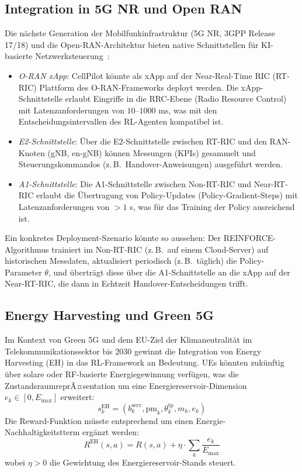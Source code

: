 ﻿\documentclass[a4paper,12pt]{article}
\theoremstyle{definition}
\begin{document}
\subsection{Integration in 5G NR und Open RAN}

Die n\"achste Generation der Mobilfunkinfrastruktur (5G NR, 3GPP Release 17/18)
und die Open-RAN-Architektur bieten native Schnittstellen f\"ur KI-basierte
Netzwerksteuerung~\cite{polese2022}:

\begin{itemize}
  \item \emph{O-RAN xApp}: CellPilot k\"onnte als xApp auf der Near-Real-Time RIC (RT-RIC)
    Plattform des O-RAN-Frameworks deployt werden. Die xApp-Schnittstelle erlaubt
    Eingriffe in die RRC-Ebene (Radio Resource Control) mit Latenzanforderungen
    von $10$--$1000$ ms, was mit den Entscheidungsintervallen des RL-Agenten kompatibel ist.
  \item \emph{E2-Schnittstelle}: \"Uber die E2-Schnittstelle zwischen RT-RIC und
    den RAN-Knoten (gNB, en-gNB) k\"onnen Messungen (KPIs) gesammelt und
    Steuerungskommandos (z.\,B.\ Handover-Anweisungen) ausgef\"uhrt werden.
  \item \emph{A1-Schnittstelle}: Die A1-Schnittstelle zwischen Non-RT-RIC und
    Near-RT-RIC erlaubt die \"Ubertragung von Policy-Updates (Policy-Gradient-Steps)
    mit Latenzanforderungen von $> 1$ s, was f\"ur das Training der Policy
    ausreichend ist.
\end{itemize}

Ein konkretes Deployment-Szenario k\"onnte so aussehen: Der REINFORCE-Algorithmus
trainiert im Non-RT-RIC (z.\,B.\ auf einem Cloud-Server) auf historischen Messdaten,
aktualisiert periodisch (z.\,B.\ t\"aglich) die Policy-Parameter $\theta$, und
\"ubertr\"agt diese \"uber die A1-Schnittstelle an die xApp auf der Near-RT-RIC,
die dann in Echtzeit Handover-Entscheidungen trifft.

\subsection{Energy Harvesting und Green 5G}

Im Kontext von Green 5G und dem EU-Ziel der Klimaneutralit\"at im Telekommunikationssektor
bis 2030 gewinnt die Integration von Energy Harvesting (EH) in das RL-Framework an Bedeutung.
UEs k\"onnten zuk\"unftig \"uber solare oder RF-basierte Energiegewinnung verf\"ugen, was die
ZustandsraumreprÃ¤sentation um eine Energiereservoir-Dimension $e_k \in [0, E_{\max}]$ erweitert:
\[
  s_k^{\mathrm{EH}} = (b_k^{\mathrm{serv}}, \mathrm{pm}_k, \theta_k^{\mathrm{tp}}, m_k, e_k)
\]
Die Reward-Funktion m\"usste entsprechend um einen Energie-Nachhaltigkeitstterm erg\"anzt werden:
\[
  R^{\mathrm{EH}}(s, a) = R(s, a) + \eta \cdot \sum_k \frac{e_k}{E_{\max}}
\]
wobei $\eta > 0$ die Gewichtung des Energiereservoir-Stands steuert.
\end{document}

